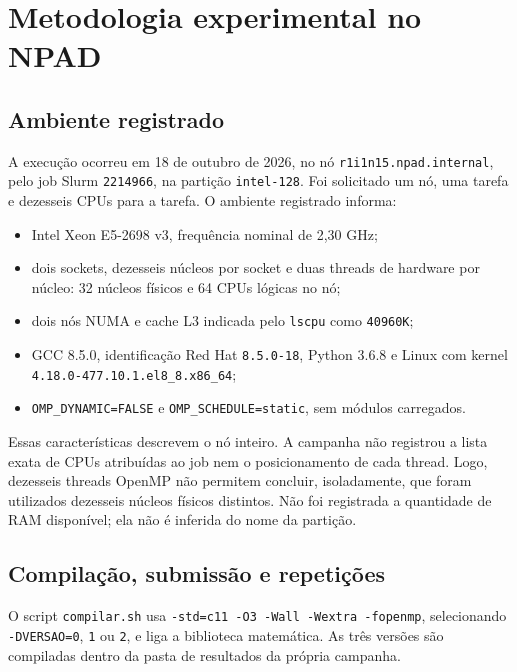 \documentclass[12pt,a4paper]{article}
\begin{document}
\section{Metodologia experimental no NPAD}
\subsection{Ambiente registrado}
A execução ocorreu em 18 de outubro de 2026, no nó \texttt{r1i1n15.npad.internal}, pelo job Slurm \texttt{2214966}, na partição \texttt{intel-128}. Foi solicitado um nó, uma tarefa e dezesseis CPUs para a tarefa. O ambiente registrado informa:
\begin{itemize}
\item Intel Xeon E5-2698 v3, frequência nominal de 2,30 GHz;
\item dois sockets, dezesseis núcleos por socket e duas threads de hardware por núcleo: 32 núcleos físicos e 64 CPUs lógicas no nó;
\item dois nós NUMA e cache L3 indicada pelo \texttt{lscpu} como \texttt{40960K};
\item GCC 8.5.0, identificação Red Hat \texttt{8.5.0-18}, Python 3.6.8 e Linux com kernel \texttt{4.18.0-477.10.1.el8\_8.x86\_64};
\item \texttt{OMP\_DYNAMIC=FALSE} e \texttt{OMP\_SCHEDULE=static}, sem módulos carregados.
\end{itemize}
Essas características descrevem o nó inteiro. A campanha não registrou a lista exata de CPUs atribuídas ao job nem o posicionamento de cada thread. Logo, dezesseis threads OpenMP não permitem concluir, isoladamente, que foram utilizados dezesseis núcleos físicos distintos. Não foi registrada a quantidade de RAM disponível; ela não é inferida do nome da partição.

\subsection{Compilação, submissão e repetições}
O script \texttt{compilar.sh} usa \texttt{-std=c11 -O3 -Wall -Wextra -fopenmp}, selecionando \texttt{-DVERSAO=0}, \texttt{1} ou \texttt{2}, e liga a biblioteca matemática. As três versões são compiladas dentro da pasta de resultados da própria campanha.
\end{document}
